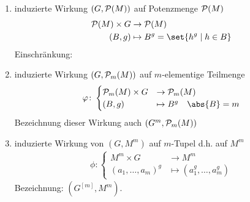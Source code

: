 \begin{example}
	\begin{enumerate}
		\item induzierte Wirkung $(G,\mathcal{P}(M))$ auf Potenzmenge $\mathcal{P}(M)$
		\begin{align*}
			\powerset(M) \times G &\to \powerset(M)\\
			(B,g) &\mapsto B^g = \set{h^g \mid h \in B} 
		\end{align*}
		Einschränkung:
		\item induzierte Wirkung $(G,\mathcal{P}_m(M))$ auf $m$-elementige Teilmenge
		\begin{align*}
			\phi\colon \begin{cases}
				\powerset_m(M) \times G &\to \powerset_m(M)\\
				(B,g) &\mapsto B^g \quad \abs{B} = m
			\end{cases}
		\end{align*}
		Bezeichnung dieser Wirkung auch $(G^{m}, \mathcal{P}_m(M))$
		\item induzierte Wirkung von $(G,M^m)$ auf $m$-Tupel d.h. auf $M^m$
		\begin{align*}
			\phi \colon \begin{cases}
				M^m \times G &\to M^m\\
				(a_1, \dots, a_m)^g &\mapsto (a_1^g, \dots, a_m^g)
			\end{cases}
		\end{align*}
		Bezeichnung: $(G^{[m]}, M^m)$.
	\end{enumerate}
\end{example}
